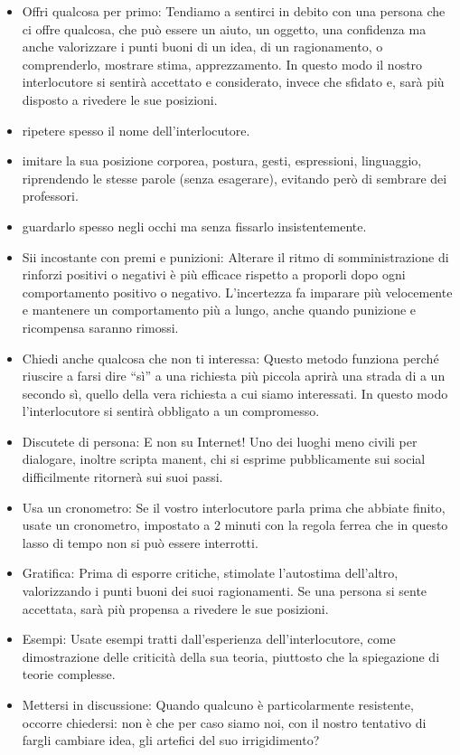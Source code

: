 \documentclass[12pt]{book} %
\begin{document}
\begin{itemize}
\item Offri qualcosa per primo: Tendiamo a sentirci in debito con una persona che ci offre qualcosa, che può essere un
aiuto, un oggetto, una confidenza ma anche valorizzare i punti buoni di un idea, di un ragionamento, o comprenderlo,
mostrare stima, apprezzamento. In questo modo il nostro interlocutore si sentirà accettato e considerato, invece che
sfidato e, sarà più disposto a rivedere le sue posizioni.
\item ripetere spesso il nome dell'interlocutore.
\item imitare la sua posizione corporea, postura, gesti, espressioni, linguaggio, riprendendo le stesse parole (senza
esagerare), evitando però di sembrare dei professori.
\item guardarlo spesso negli occhi ma senza fissarlo insistentemente.
\item Sii incostante con premi e punizioni: Alterare il ritmo di somministrazione di rinforzi positivi o negativi è più
efficace rispetto a proporli dopo ogni comportamento positivo o negativo. L'incertezza fa imparare più velocemente e
mantenere un comportamento più a lungo, anche quando punizione e ricompensa saranno
rimossi.
\item Chiedi anche qualcosa che non ti interessa: Questo metodo funziona perché riuscire a farsi dire “sì” a una
richiesta più piccola aprirà una strada di a un secondo sì, quello della vera richiesta a cui siamo interessati. In
questo modo l'interlocutore si sentirà obbligato a un compromesso.
\item Discutete di persona: E non su Internet! Uno dei luoghi meno civili per dialogare, inoltre scripta manent, chi si
esprime pubblicamente sui social difficilmente ritornerà sui suoi passi.
\item Usa un cronometro: Se il vostro interlocutore parla prima che abbiate finito, usate un cronometro, impostato a 2
minuti con la regola ferrea che in questo lasso di tempo non si può essere interrotti.
\item Gratifica: Prima di esporre critiche, stimolate l'autostima dell'altro, valorizzando i punti buoni dei suoi
ragionamenti. Se una persona si sente accettata, sarà più propensa a rivedere le sue posizioni.
\item Esempi: Usate esempi tratti dall'esperienza dell'interlocutore, come dimostrazione delle criticità della sua
teoria, piuttosto che la spiegazione di teorie complesse.
\item Mettersi in discussione: Quando qualcuno è particolarmente resistente, occorre chiedersi: non è che per caso siamo
noi, con il nostro tentativo di fargli cambiare idea, gli artefici del suo irrigidimento?
\end{itemize}
\end{document}
